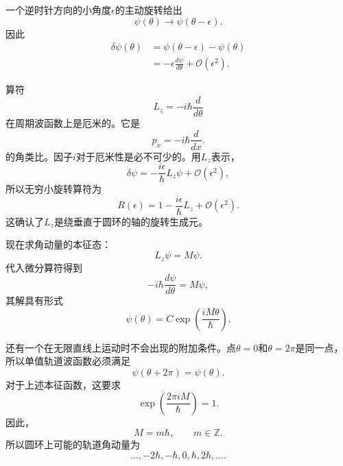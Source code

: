 一个逆时针方向的小角度\(\epsilon\)的主动旋转给出
\begin{equation}
\psi(\theta)\longrightarrow\psi(\theta-\epsilon).
\end{equation}
因此
\begin{align}
\delta\psi(\theta)
&=\psi(\theta-\epsilon)-\psi(\theta)\\
&=-\epsilon\frac{d\psi}{d\theta}
+\mathcal O(\epsilon^2).
\end{align}

算符
\begin{equation}
L_z=-i\hbar\frac{d}{d\theta}
\end{equation}
在周期波函数上是厄米的。它是
\begin{equation}
p_x=-i\hbar\frac{d}{dx}.
\end{equation}
的角类比。因子\(i\)对于厄米性是必不可少的。用\(L_z\)表示，
\begin{equation}
\delta\psi
=-\frac{i\epsilon}{\hbar}L_z\psi
+\mathcal O(\epsilon^2),
\end{equation}
所以无穷小旋转算符为
\begin{equation}
R(\epsilon)
=1-\frac{i\epsilon}{\hbar}L_z
+\mathcal O(\epsilon^2).
\end{equation}
这确认了\(L_z\)是绕垂直于圆环的轴的旋转生成元。

\begin{classroomqa}
\end{classroomqa}

现在求角动量的本征态：
\begin{equation}
L_z\psi=M\psi.
\end{equation}
代入微分算符得到
\begin{equation}
-i\hbar\frac{d\psi}{d\theta}=M\psi,
\end{equation}
其解具有形式
\begin{equation}
\psi(\theta)=C\exp\left(\frac{iM\theta}{\hbar}\right).
\end{equation}

还有一个在无限直线上运动时不会出现的附加条件。点\(\theta=0\)和\(\theta=2\pi\)是同一点，所以单值轨道波函数必须满足
\begin{equation}
\psi(\theta+2\pi)=\psi(\theta).
\end{equation}
对于上述本征函数，这要求
\begin{equation}
\exp\left(\frac{2\pi iM}{\hbar}\right)=1.
\end{equation}
因此，
\begin{equation}
M=m\hbar,
\qquad
m\in\mathbb Z.
\end{equation}
所以圆环上可能的轨道角动量为
\begin{equation}
\ldots,-2\hbar,-\hbar,0,\hbar,2\hbar,\ldots.
\end{equation}

